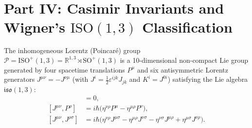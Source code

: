 \documentclass[11pt]{article}
\begin{document}
\section{Part IV: Casimir Invariants and Wigner's $\mathrm{ISO}(1,3)$ Classification}
The inhomogeneous Lorentz (Poincar\'e) group $\mathcal{P} = \mathrm{ISO}^+(1,3) = \mathbb{R}^{1,3} \rtimes \mathrm{SO}^+(1,3)$ is a 10-dimensional non-compact Lie group generated by four spacetime translations $P^\mu$ and six antisymmetric Lorentz generators $J^{\mu\nu} = -J^{\nu\mu}$ (with $J^i = \tfrac{1}{2}\varepsilon^{ijk}J_{jk}$ and $K^i = J^{0i}$) satisfying the Lie algebra $\mathfrak{iso}(1,3)$:
\begin{align}
[P^\mu, P^\nu] &= 0, \\
[J^{\mu\nu}, P^\rho] &= i\hbar \bigl(\eta^{\nu\rho} P^\mu - \eta^{\mu\rho} P^\nu\bigr), \\
[J^{\mu\nu}, J^{\rho\sigma}] &= i\hbar \bigl(\eta^{\nu\rho} J^{\mu\sigma} - \eta^{\mu\rho} J^{\nu\sigma} - \eta^{\nu\sigma} J^{\mu\rho} + \eta^{\mu\sigma} J^{\nu\rho}\bigr).
\end{align}
\end{document}
